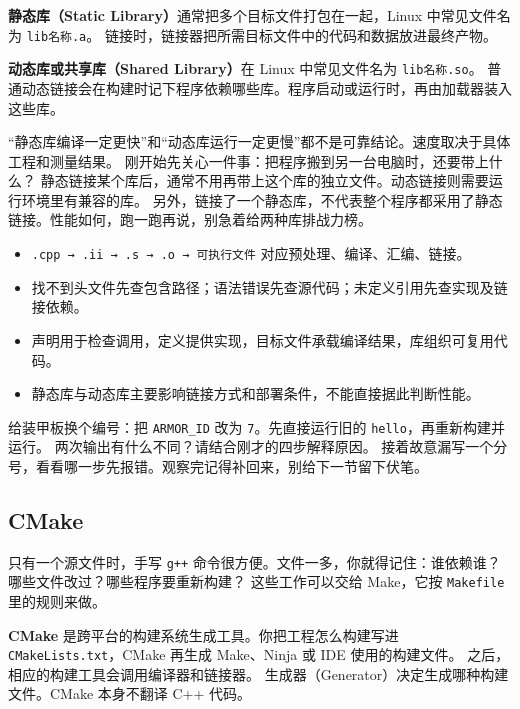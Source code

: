 \textbf{静态库（Static Library）}通常把多个目标文件打包在一起，Linux 中常见文件名为 \texttt{lib名称.a}。
链接时，链接器把所需目标文件中的代码和数据放进最终产物。

\textbf{动态库或共享库（Shared Library）}在 Linux 中常见文件名为 \texttt{lib名称.so}。
普通动态链接会在构建时记下程序依赖哪些库。程序启动或运行时，再由加载器装入这些库。

\begin{note}
“静态库编译一定更快”和“动态库运行一定更慢”都不是可靠结论。速度取决于具体工程和测量结果。
刚开始先关心一件事：把程序搬到另一台电脑时，还要带上什么？
静态链接某个库后，通常不用再带上这个库的独立文件。动态链接则需要运行环境里有兼容的库。
另外，链接了一个静态库，不代表整个程序都采用了静态链接。性能如何，跑一跑再说，别急着给两种库排战力榜。
\end{note}

\begin{conclusion}
\begin{itemize}
    \item \texttt{.cpp → .ii → .s → .o → 可执行文件} 对应预处理、编译、汇编、链接。
    \item 找不到头文件先查包含路径；语法错误先查源代码；未定义引用先查实现及链接依赖。
    \item 声明用于检查调用，定义提供实现，目标文件承载编译结果，库组织可复用代码。
    \item 静态库与动态库主要影响链接方式和部署条件，不能直接据此判断性能。
\end{itemize}
\end{conclusion}

\begin{exercise}\label{ex:v1-build-stages}
给装甲板换个编号：把 \texttt{ARMOR\_ID} 改为 \texttt{7}。先直接运行旧的 \texttt{hello}，再重新构建并运行。
两次输出有什么不同？请结合刚才的四步解释原因。
接着故意漏写一个分号，看看哪一步先报错。观察完记得补回来，别给下一节留下伏笔。
\end{exercise}

\subsection{CMake}
\label{sec:cmake-basics}

只有一个源文件时，手写 \texttt{g++} 命令很方便。文件一多，你就得记住：谁依赖谁？哪些文件改过？哪些程序要重新构建？
这些工作可以交给 Make，它按 \texttt{Makefile} 里的规则来做。

\textbf{CMake} 是跨平台的构建系统生成工具。你把工程怎么构建写进 \texttt{CMakeLists.txt}，CMake 再生成 Make、Ninja 或 IDE 使用的构建文件。
之后，相应的构建工具会调用编译器和链接器。
生成器（Generator）决定生成哪种构建文件。CMake 本身不翻译 C++ 代码。

